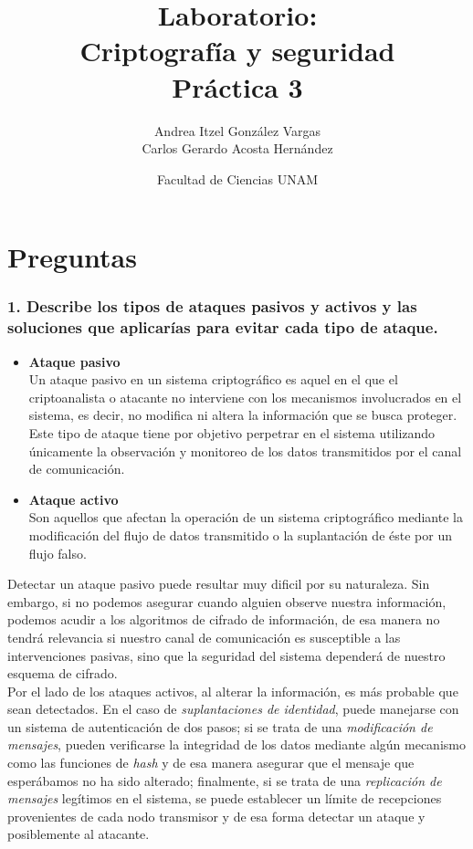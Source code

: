 \documentclass[12pt]{article}
\title{Laboratorio: \\Criptografía y seguridad \\ Práctica 3}
\author{Andrea Itzel González Vargas \\ Carlos Gerardo Acosta Hernández}
\date{Facultad de Ciencias UNAM}
\begin{document}
\maketitle
\section*{Preguntas}
\subsubsection*{1. Describe los tipos de ataques pasivos y activos y las soluciones que aplicarías para evitar cada tipo de ataque.}
\begin{itemize}
\item \textbf{Ataque pasivo}\\
  Un ataque pasivo en un sistema criptográfico es aquel en el que el
  criptoanalista o atacante no interviene con los mecanismos involucrados en el sistema, es decir, no modifica ni altera la información que se
  busca proteger. Este tipo de ataque tiene por objetivo perpetrar
  en el sistema utilizando únicamente la observación y monitoreo de
  los datos transmitidos por el canal de comunicación. 
\item \textbf{Ataque activo}\\
  Son aquellos que afectan la operación de un sistema criptográfico
  mediante la modificación del flujo de datos transmitido o la
  suplantación de éste por un flujo falso.
\end{itemize}
Detectar un ataque pasivo puede resultar muy dificil por su naturaleza.
Sin embargo, si no podemos asegurar cuando alguien observe nuestra información, podemos acudir a los algoritmos de cifrado de información,
de esa manera no tendrá relevancia si nuestro canal de comunicación
es susceptible a las intervenciones pasivas, sino que la seguridad del sistema dependerá de nuestro esquema de cifrado.\\

Por el lado de los ataques activos, al alterar la información, es más
probable que sean detectados. En el caso de \textit{suplantaciones de identidad},
puede manejarse con un sistema de autenticación de dos pasos;
si se trata de una \textit{modificación de mensajes}, pueden verificarse la
integridad de los datos mediante algún mecanismo como las funciones
de \textit{hash} y de esa manera asegurar que el mensaje que esperábamos
no ha sido alterado; finalmente, si se trata de una \textit{replicación de
mensajes} legítimos en el sistema, se puede establecer un límite de
recepciones provenientes de cada nodo transmisor y de esa forma detectar
un ataque y posiblemente al atacante.
\end{document}
